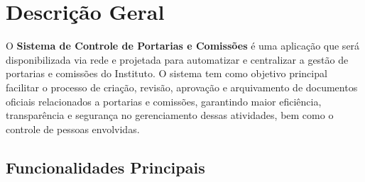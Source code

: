 \documentclass{scrreprt}
\begin{document}
\chapter{Descrição Geral}

O \textbf{Sistema de Controle de Portarias e Comissões} é uma aplicação que será disponibilizada via rede e projetada para automatizar e centralizar a gestão de portarias e comissões do Instituto. O sistema tem como objetivo principal facilitar o processo de criação, revisão, aprovação e arquivamento de documentos oficiais relacionados a portarias e comissões, garantindo maior eficiência, transparência e segurança no gerenciamento dessas atividades, bem como o controle de pessoas envolvidas.

\section{Funcionalidades Principais}
\end{document}
